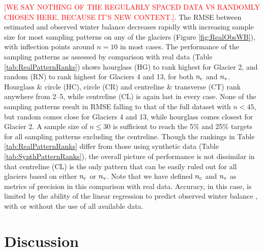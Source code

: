 \documentclass[twocolumn,letterpaper]{igs}
\begin{document}
\textcolor{red}{[WE SAY NOTHING OF THE REGULARLY SPACED DATA VS RANDOMLY CHOSEN HERE, BECAUSE IT'S NEW CONTENT.]}.
The RMSE between estimated and observed winter balance decreases rapidly with increasing sample size for most sampling patterns on any of the glaciers (Figure \ref{fig:RealObsWB}), with inflection points around $n=10$ in most cases. 
The performance of the sampling patterns as assessed by comparison with real data (Table \ref{tab:RealPatternRanks}) shows hourglass (HG) to rank highest for Glacier 2, and random (RN) to rank highest for Glaciers 4 and 13, for both $n_{\rm c}$ and $n_{\rm v}$. Hourglass \& circle (HC), circle (CR) and centreline \& transverse (CT) rank anywhere from 2--5, while centreline (CL) is again last in every case. 
None of the sampling patterns result in RMSE falling to that of the full dataset with $n < 45$, but random comes close for Glaciers 4 and 13, while hourglass comes closest for Glacier 2. A sample size of $n \leq 30$ is sufficient to reach the 5\% and 25\% targets for all sampling patterns excluding the centreline. 
Though the rankings in Table \ref{tab:RealPatternRanks} differ from those using synthetic data (Table \ref{tab:SynthPatternRanks}), the overall picture of performance is not dissimilar in that centreline (CL) is the only pattern that can be easily ruled out for all glaciers based on either $n_{\rm c}$ or $n_{\rm v}$.  
Note that  we have defined $n_{\rm c}$ and $n_{\rm v}$ as metrics of precision in this comparison with real data. Accuracy, in this case, is limited by the ability of the linear regression to predict observed winter balance \citep[see][]{Pulwicki2017}, with or without the use of all available data. 
    

\section{Discussion}
\end{document}
